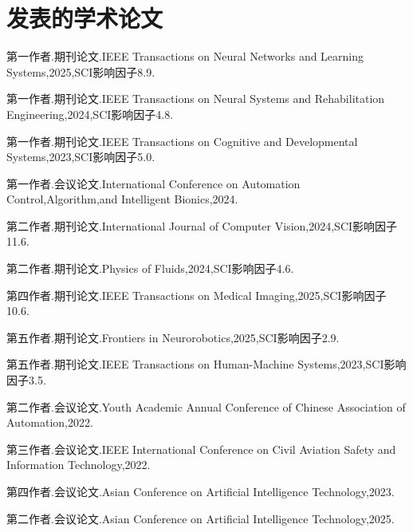 \begin{resume}
	\begin{refsection}
	\nocite{比赛2024-1, 比赛2024-2, 比赛2023-1, 比赛2023-2, 比赛2023-3, 比赛2023-4, 比赛2022-1}%
	\printbibliography[heading=subbibliography,title={获得的竞赛奖项}]
	\end{refsection}

	\begin{refsection}[ref/resume.bib]
  \nocite{科技2030, 多模态, 国防2023}%
	\printbibliography[heading=subbibliography,title={参与的科研项目}]
	\end{refsection}
\endgroup


\else

  \section*{发表的学术论文} %

  \begin{enumerate}[label={[\arabic*]},labelsep=6pt,topsep=0pt,partopsep=0pt,
parsep=0pt,itemsep=1pt,leftmargin=0em,itemindent=42pt]
  \item 第一作者.期刊论文.IEEE Transactions on Neural Networks and Learning Systems,2025,SCI影响因子8.9.
  \item 第一作者.期刊论文.IEEE Transactions on Neural Systems and Rehabilitation Engineering,2024,SCI影响因子4.8.
  \item 第一作者.期刊论文.IEEE Transactions on Cognitive and Developmental Systems,2023,SCI影响因子5.0.
  \item 第一作者.会议论文.International Conference on Automation Control,Algorithm,and Intelligent Bionics,2024.
  \item 第二作者.期刊论文.International Journal of Computer Vision,2024,SCI影响因子11.6.
  \item 第二作者.期刊论文.Physics of Fluids,2024,SCI影响因子4.6.
  \item 第四作者.期刊论文.IEEE Transactions on Medical Imaging,2025,SCI影响因子10.6.
  \item 第五作者.期刊论文.Frontiers in Neurorobotics,2025,SCI影响因子2.9.
  \item 第五作者.期刊论文.IEEE Transactions on Human-Machine Systems,2023,SCI影响因子3.5.
  \item 第二作者.会议论文.Youth Academic Annual Conference of Chinese Association of Automation,2022.
  \item 第三作者.会议论文.IEEE International Conference on Civil Aviation Safety and Information Technology,2022.
  \item 第四作者.会议论文.Asian Conference on Artificial Intelligence Technology,2023.
  \item 第二作者.会议论文.Asian Conference on Artificial Intelligence Technology,2025.
  \end{enumerate}


\end{resume}
